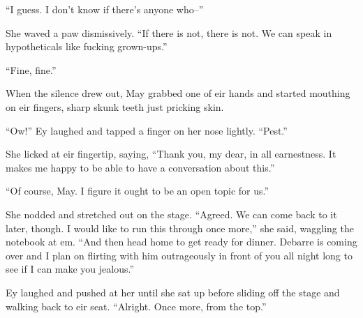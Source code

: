 ``I guess. I don't know if there's anyone who--''

She waved a paw dismissively. ``If there is not, there is not. We can speak in hypotheticals like fucking grown-ups.''

``Fine, fine.''

When the silence drew out, May grabbed one of eir hands and started mouthing on eir fingers, sharp skunk teeth just pricking skin.

``Ow!'' Ey laughed and tapped a finger on her nose lightly. ``Pest.''

She licked at eir fingertip, saying, ``Thank you, my dear, in all earnestness. It makes me happy to be able to have a conversation about this.''

``Of course, May. I figure it ought to be an open topic for us.''

She nodded and stretched out on the stage. ``Agreed. We can come back to it later, though. I would like to run this through once more,'' she said, waggling the notebook at em. ``And then head home to get ready for dinner. Debarre is coming over and I plan on flirting with him outrageously in front of you all night long to see if I can make you jealous.''

Ey laughed and pushed at her until she sat up before sliding off the stage and walking back to eir seat. ``Alright. Once more, from the top.''
